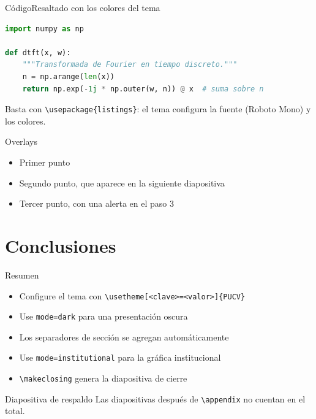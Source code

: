\documentclass[11pt,aspectratio=\proporcion,xcolor=table]{beamer}
\begin{document}
\begin{frame}[fragile]{Código}{Resaltado con los colores del tema}
  \begin{lstlisting}[language=Python]
import numpy as np

def dtft(x, w):
    """Transformada de Fourier en tiempo discreto."""
    n = np.arange(len(x))
    return np.exp(-1j * np.outer(w, n)) @ x  # suma sobre n
  \end{lstlisting}
  Basta con \texttt{\textbackslash usepackage\{listings\}}: el tema configura
  la fuente (Roboto Mono) y los colores.
\end{frame}

\begin{frame}{Overlays}
  \begin{itemize}
    \item<1-> Primer punto
    \item<2-> Segundo punto, que aparece en la siguiente diapositiva
    \item<3-> Tercer punto, con una \alert<3>{alerta en el paso 3}
  \end{itemize}
\end{frame}

\section{Conclusiones}

\begin{frame}{Resumen}
  \begin{itemize}
    \item Configure el tema con \texttt{\textbackslash usetheme[<clave>=<valor>]\{PUCV\}}
    \item Use \texttt{mode=dark} para una presentación oscura
    \item Los separadores de sección se agregan automáticamente
    \item Use \texttt{mode=institutional} para la gráfica institucional
    \item \texttt{\textbackslash makeclosing} genera la diapositiva de cierre
  \end{itemize}
\end{frame}


\appendix

\begin{frame}{Diapositiva de respaldo}
  Las diapositivas después de \texttt{\textbackslash appendix} no cuentan en el total.
\end{frame}
\end{document}
